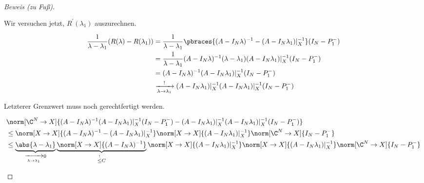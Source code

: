 \begin{proof}[Beweis (zu Fuß)]
\begin{enumerate}[label = (\roman*)]
        Wir versuchen jetzt, $R^\prime(\lambda_1)$ auszurechnen.

        \begin{align*}
            \frac{1}{\lambda - \lambda_1}
            (R(\lambda) - R(\lambda_1))
            & =
            \frac{1}{\lambda - \lambda_1}
            \pbraces
            {
                (A - I_N \lambda)^{-1}
                -
                (A - I_N \lambda_1) |_X^{-1}
            }
            (I_N - P_1^-) \\
            & =
            \frac{1}{\lambda - \lambda_1}
            (A - I_N \lambda)^{-1}
            (\lambda - \lambda_1)
            (A - I_N \lambda_1) |_X^{-1}
            (I_N - P_1^-) \\
            & =
            (A - I_N \lambda)^{-1}
            (A - I_N \lambda_1) |_X^{-1}
            (I_N - P_1^-) \\
            & \xrightarrow[\lambda \to \lambda_1]{!}
            (A - I_N \lambda_1) |_X^{-1}
            (A - I_N \lambda_1) |_X^{-1}
            (I_N - P_1^-)
        \end{align*}

        Letzterer Grenzwert muss noch gerechtfertigt werden.

        \begin{align*}
            &
            \norm[\C^N \to X]
            {
                (A - I_N \lambda)^{-1}
                (A - I_N \lambda_1) |_X^{-1}
                (I_N - P_1^-)
                -
                (A - I_N \lambda_1) |_X^{-1}
                (A - I_N \lambda_1) |_X^{-1}
                (I_N - P_1^-)
            } \\
            & \leq
            \norm[X \to X]
            {
                (A - I_N \lambda)^{-1}
                -
                (A - I_N \lambda_1) |_X^{-1}
            }
            \norm[X \to X]{(A - I_N \lambda_1) |_X^{-1}}
            \norm[\C^N \to X]{I_N - P_1^-} \\
            & \leq
            \underbrace
            {
                \abs{\lambda - \lambda_1}
            }_{
                \xrightarrow[\lambda \to \lambda_1]{} 0
            }
            \underbrace
            {
                \norm[X \to X]{(A - I_N \lambda)^{-1}}
            }_{
                \stackrel{!}{\leq} C
            }
            \norm[X \to X]{(A - I_N \lambda_1) |_X^{-1}}
            \norm[X \to X]{(A - I_N \lambda_1) |_X^{-1}}
            \norm[\C^N \to X]{I_N - P_1^-}
        \end{align*}


\end{enumerate}
\end{proof}
